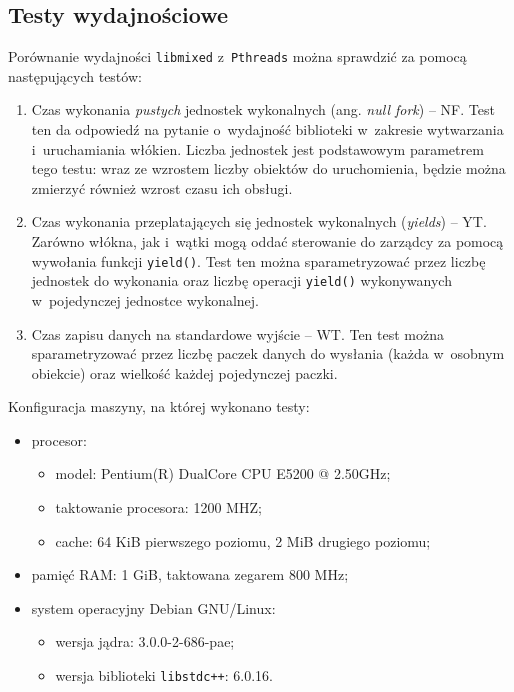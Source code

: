 \documentclass[12pt]{mwart}
\newcommand{\code}{\texttt}
\newcommand{\procbr}{()}
\newcommand{\function}[1]{\code{#1\procbr}}
\begin{document}
\subsection{Testy wydajnościowe}
\indent
	Porównanie wydajności \code{libmixed} z~\code{Pthreads} można sprawdzić za pomocą następujących testów:
	\begin{enumerate}
		\item Czas wykonania \emph{pustych} jednostek wykonalnych (ang. \emph{null fork}) -- NF. Test ten da odpowiedź na pytanie o~wydajność biblioteki w~zakresie
      wytwarzania i~uruchamiania włókien. Liczba jednostek jest podstawowym parametrem tego testu: wraz ze wzrostem liczby obiektów do
      uruchomienia, będzie można zmierzyć również wzrost czasu ich obsługi.
    \item Czas wykonania przeplatających się jednostek wykonalnych (\emph{yields}) -- YT. Zarówno włókna, jak i~wątki mogą oddać sterowanie do zarządcy za pomocą wywołania funkcji 
      \function{yield}. Test ten można sparametryzować przez liczbę jednostek do wykonania oraz liczbę operacji \function{yield} wykonywanych
      w~pojedynczej jednostce wykonalnej.
		\item Czas zapisu danych na standardowe wyjście -- WT. Ten test można sparametryzować przez liczbę paczek danych do wysłania (każda w~osobnym obiekcie)
      oraz wielkość każdej pojedynczej paczki.
	\end{enumerate}
\par
\indent
  Konfiguracja maszyny, na której wykonano testy:
  \begin{itemize}
    \item procesor: 
      \begin{itemize}
        \item model: Pentium(R) Dual\dywiz Core  CPU      E5200  @ 2.50GHz;
        \item taktowanie procesora: 1200 MHZ;
        \item cache: 64 KiB pierwszego poziomu, 2 MiB drugiego poziomu;
      \end{itemize}
    \item pamięć RAM: 1 GiB, taktowana zegarem 800 MHz;
    \item system operacyjny Debian GNU/Linux:
      \begin{itemize}
        \item wersja jądra: 3.0.0-2-686-pae;
        \item wersja biblioteki \code{libstdc++}: 6.0.16.
      \end{itemize}
  \end{itemize}
\end{document}
